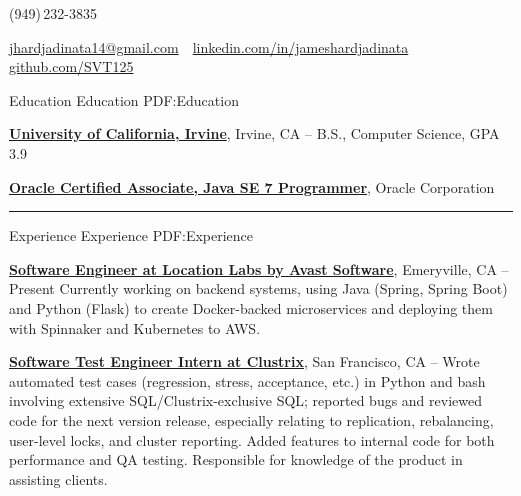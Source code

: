 \documentclass[letterpaper,MMMyyyy,nonstopmode]{simpleresumecv}
\makeatletter
\newcommand{\ResumeAuthor}{James Hardjadinata}
\newcommand{\ResumeWebsite}{github.com/SVT125}
\newcommand{\ResumeLinkedin}{linkedin.com/in/jameshardjadinata}
\newcommand{\ResumeEmail}{jhardjadinata14@gmail.com}
\makeatother
\begin{document}

\Title{\ResumeAuthor}
\begin{SubTitle}
(949)\,232-3835
\par
\href{mailto:\ResumeEmail}
{\ResumeEmail}
\,\textbullet\,
\href{\ResumeLinkedin}
{\url{\ResumeLinkedin}}\,
\,\textbullet\,
\href{\ResumeWebsite}
{\url{\ResumeWebsite}}
\end{SubTitle}

\begin{Body}


\Section
{Education}
{Education}
{PDF:Education}

\Entry
\href{https://uci.edu/}
{\textbf{University of California, Irvine}},
Irvine, CA
\hfill
{} --
\Gap
B.S., Computer Science, GPA 3.9\newline

\Entry
\href{http://education.oracle.com/pls/web_prod-plq-dad/db_pages.getpage?page_id=5001&get_params=p_exam_id:1Z0-803&p_org_id=&lang=}
{\textbf{Oracle Certified Associate, Java SE 7 Programmer}},
Oracle Corporation
\hfill
{}
\newline
\Gap

\hrule


\Section
{Experience}
{Experience}
{PDF:Experience}

\Entry
\href{https://www.locationlabs.com/}
{\textbf{Software Engineer at Location Labs by Avast Software}},
Emeryville, CA
\hfill
{} --
Present
\Gap
Currently working on backend systems, using Java (Spring, Spring Boot) and Python (Flask) to create Docker-backed microservices and deploying them with Spinnaker and Kubernetes to AWS.
\newline

\Entry
\href{http://www.clustrix.com/}
{\textbf{Software Test Engineer Intern at Clustrix}},
San Francisco, CA
\hfill
{} --
\Gap
Wrote automated test cases (regression, stress, acceptance, etc.) in Python and bash involving extensive SQL/Clustrix-exclusive
SQL; reported bugs and reviewed code for the next version release, especially relating to replication, rebalancing, user-level locks, and cluster reporting. Added features to internal code for both performance and QA
testing. Responsible for knowledge of the product in assisting clients.\newline


\end{Body}
\end{document}
